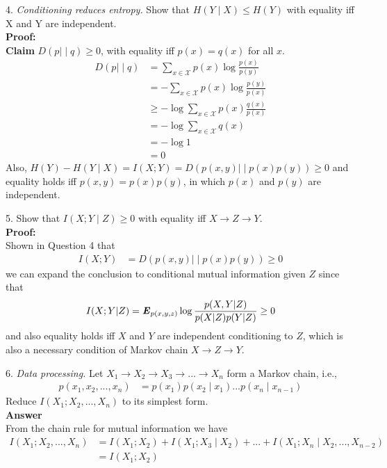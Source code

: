 \documentclass[12pt]{article}
\begin{document}
	\par
	4. \textit{Conditioning reduces entropy.} Show that $H(Y{\mid}X) \leq H(Y)$ with equality iff X and Y are independent.\\
	\textbf{Proof:} \\
	\textbf{Claim }$D(p{\mid\mid}q) \geq 0$, with equality iff $p(x) = q(x)$ for all $x$. 
	\begin{align*}
		D(p{\mid\mid}q) &= \sum_{x\in\mathcal{X}} p(x)\log\frac{p(x)}{p(y)} \\
					    &= -\sum_{x\in\mathcal{X}} p(x)\log\frac{p(y)}{p(x)} \\
					    &\geq -\log\sum_{x\in\mathcal{X}}p(x)\frac{q(x)}{p(x)} \\
					    &= -\log\sum_{x\in\mathcal{X}}q(x) \\
					    &= -\log1 \\
					    &= 0
	\end{align*}	
	Also, $H(Y)-H(Y{\mid}X) = I(X;Y) = D(p(x,y){\mid\mid}p(x)p(y)) \geq 0$ and equality holds iff $p(x,y) = p(x)p(y)$, in which $p(x)$ and $p(y)$ are independent. \\
	
	\par 
	5. Show that $I(X;Y{\mid}Z)\geq0$ with equality iff $X\rightarrow Z\rightarrow Y$. \\ 
	\textbf{Proof:} \\
	Shown in Question 4 that 
	\begin{align*}
		I(X;Y) &= D(p(x,y){\mid\mid}p(x)p(y)) \geq 0
	\end{align*}
	we can expand the conclusion to conditional mutual information given $Z$ since that 
	\begin{align*}
		I(X;Y{\mid}Z) = \textbf{\textit{E}}_{p(x,y,z)}\log\frac{p(X,Y|Z)}{p(X|Z)p(Y|Z)} \geq 0
	\end{align*}
	and also equality holds iff $X$ and $Y$ are independent conditioning to $Z$, which is also a necessary condition of Markov chain $X\rightarrow Z\rightarrow Y$.\\
	
	\par 
	6. \textit{Data processing.} Let $X_1\rightarrow X_2\rightarrow X_3\rightarrow ... \rightarrow X_n$ form a Markov chain, i.e., 
	\begin{align*}
		p(x_1,x_2,...,x_n) &= p(x_1)p(x_2{\mid}x_1)...p(x_n{\mid}x_{n-1})
	\end{align*}
	Reduce $I(X_1;X_2,...,X_n)$ to its simplest form.\\
	\textbf{Answer}\\ 
	From the chain rule for mutual information we have
	\begin{align*}
		I(X_1;X_2,...,X_n) &= I(X_1;X_2) + I(X_1;X_3{\mid}X_2) +...+ I(X_1;X_n{\mid}X_2,...,X_{n-2}) \\
		&= I(X_1;X_2)
	\end{align*}
	
\end{document}
